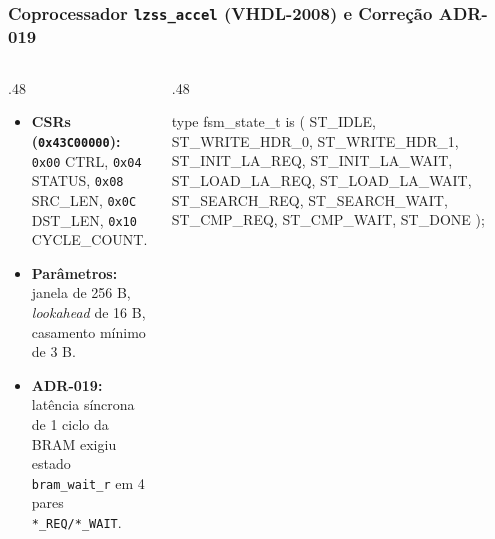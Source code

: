 \begin{frame}[fragile]
  \frametitle{Coprocessador \texttt{lzss\_accel} (VHDL-2008) e Corre\c{c}\~ao ADR-019}
  \begin{columns}[T]
    \begin{column}{.48\textwidth}
      \begin{itemize}
        \item \textbf{CSRs (\texttt{0x43C00000}):} \texttt{0x00} CTRL, \texttt{0x04} STATUS, \texttt{0x08} SRC\_LEN, \texttt{0x0C} DST\_LEN, \texttt{0x10} CYCLE\_COUNT.
        \item \textbf{Par\^ametros:} janela de 256 B, \textit{lookahead} de 16 B, casamento m\'inimo de 3 B.
        \item \textbf{ADR-019:} lat\^encia s\'incrona de 1 ciclo da BRAM exigiu estado \texttt{bram\_wait\_r} em 4 pares \texttt{*\_REQ/*\_WAIT}.
      \end{itemize}
    \end{column}
    \begin{column}{.48\textwidth}
      \begin{vhdlcode}
type fsm_state_t is (
  ST_IDLE, ST_WRITE_HDR_0, ST_WRITE_HDR_1,
  ST_INIT_LA_REQ, ST_INIT_LA_WAIT,
  ST_LOAD_LA_REQ, ST_LOAD_LA_WAIT,
  ST_SEARCH_REQ, ST_SEARCH_WAIT,
  ST_CMP_REQ, ST_CMP_WAIT, ST_DONE
);
      \end{vhdlcode}
    \end{column}
  \end{columns}
\end{frame}
